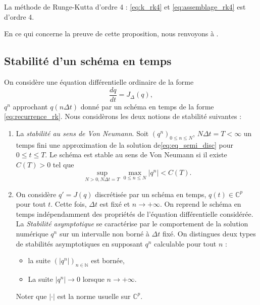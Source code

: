 \begin{proposition}
La méthode de Runge-Kutta d'ordre 4 : \eqref{eq:k_rk4} et \eqref{eq:assemblage_rk4} est d'ordre 4.
\end{proposition}
En ce qui concerne la preuve de cette proposition, nous renvoyons à \cite{Demailly2016}.


\subsection{Stabilité d'un schéma en temps}

On considère une équation différentielle ordinaire de la forme
\begin{equation}
\dfrac{dq}{dt} = J_{\Delta}(q),
\label{eq:eq_semi_disc}
\end{equation}
$q^n$ approchant $q(n \Delta t)$ donné par un schéma en temps de la forme \eqref{eq:recurrence_rk}. Nous considèrons les deux notions de stabilité suivantes :
\begin{enumerate}
\item La \textit{stabilité au sens de Von Neumann}. Soit $(q^n)_{0 \leq n \leq N}$, $N \Delta t = T < \infty$ un temps fini une approximation de la solution de\eqref{eq:eq_semi_disc} pour $0 \leq t \leq T$. Le schéma est stable au sens de Von Neumann si il existe $C(T)>0$ tel que
\begin{equation}
\sup_{N>0, N \Delta t = T} \max_{0 \leq n \leq N} |q^n| < C(T).
\end{equation}

\item On considère $q'=J(q)$ discrétisée par un schéma en temps, $q(t) \in \mathbb{C}^p$ pour tout $t$. Cette fois, $\Delta t$ est fixé et $n \rightarrow + \infty$. On reprend le schéma en temps indépendamment des propriétés de l'équation différentielle considérée. La \textit{Stabilité asymptotique} se caractérise par le comportement de la solution numérique $q^n$ sur un intervalle non borné à $\Delta t$ fixé. On distingues deux types de stabilités asymptotiques en supposant $q^n$ calculable pour tout $n$ :
\begin{itemize}
\item la suite $(|q^n|)_{n \in \mathbb{N}}$ est bornée,
\item La suite $|q^n| \rightarrow 0$ lorsque $n \rightarrow + \infty$.
\end{itemize}
Noter que $|\cdot|$ est la norme usuelle sur $\mathbb{C}^p$.
\end{enumerate} 

